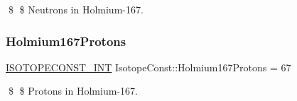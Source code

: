 \$ \$ Neutrons in Holmium-\/167. \mbox{\label{group___isotope_const-_holmium-_ho167_gaea8d0fbc84e1f68071695b97059cea5d}} 
\subsubsection{\texorpdfstring{Holmium167\+Protons}{Holmium167Protons}}
{\footnotesize\ttfamily \mbox{\hyperlink{group___isotope_const-_macros_ga5f18360b3e99483a35c32d789e62621c}{I\+S\+O\+T\+O\+P\+E\+C\+O\+N\+S\+T\+\_\+\+I\+NT}} Isotope\+Const\+::\+Holmium167\+Protons = 67}

\$ \$ Protons in Holmium-\/167. 